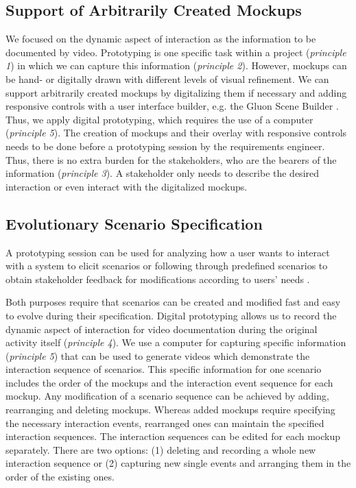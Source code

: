 \documentclass[conference]{IEEEtran}
\begin{document}
\subsection{Support of Arbitrarily Created Mockups}
We focused on the dynamic aspect of interaction as the information to be 
documented by video. Prototyping is one specific task within a project 
(\textit{principle 1}) in which we can capture this information 
(\textit{principle 2}). However, mockups can be hand- or digitally drawn with 
different levels of visual refinement. We can support arbitrarily created 
mockups by digitalizing them if necessary and adding responsive controls with a 
user interface builder, e.g. the Gluon Scene Builder \cite{Gluon}. Thus, we 
apply digital prototyping, which requires the use of a computer 
(\textit{principle 5}). The creation of mockups and their overlay with 
responsive controls needs to be done before a prototyping session by the 
requirements engineer. Thus, there is no extra burden for the stakeholders, who 
are the bearers of the information (\textit{principle 3}). A stakeholder only 
needs to describe the desired interaction or even interact with the digitalized 
mockups.

\subsection{Evolutionary Scenario Specification}
A prototyping session can be used for analyzing how a user wants to 
interact with a system to elicit scenarios or following through predefined 
scenarios to obtain stakeholder feedback for modifications according to users' 
needs \cite{Stangl.2012}.

Both purposes require that scenarios can be created and modified fast and easy 
to evolve during their specification. Digital prototyping allows us to record 
the dynamic aspect of interaction for video documentation during the original 
activity itself (\textit{principle 4}). We use a computer for capturing 
specific information (\textit{principle 5}) that can be used to generate videos 
which demonstrate the interaction sequence of scenarios. This specific 
information for one scenario includes the order of the mockups and the 
interaction event sequence for each mockup. Any modification of a scenario 
sequence can be achieved by adding, rearranging and deleting mockups. Whereas 
added mockups require specifying the necessary interaction events, rearranged 
ones can maintain the specified interaction sequences. The interaction 
sequences can be edited for each mockup separately. There are two options: 
(1) deleting and recording a whole new interaction sequence or (2) 
capturing new single events and arranging them in the order of the existing 
ones.
\end{document}
